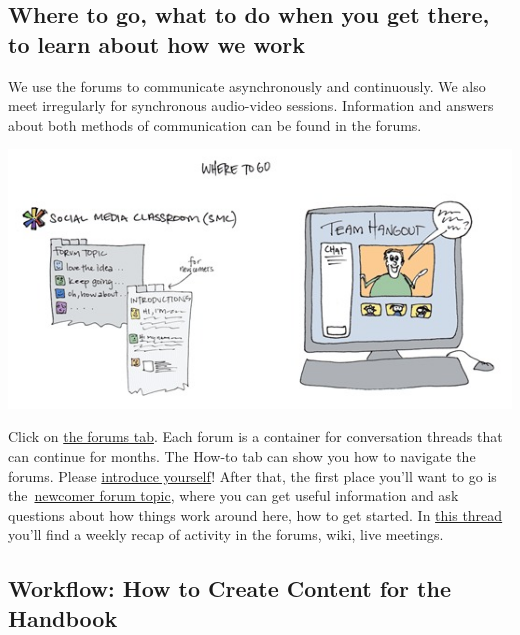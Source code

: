 \subsection{Where to go, what to do when you get there, to learn about
how we work}

We use the forums to communicate asynchronously and continuously. We
also meet irregularly for synchronous audio-video sessions. Information
and answers about both methods of communication can be found in the
forums.

\begin{center}
\href{http://peeragogy.org/wp-content/uploads/2012/03/where\_to\_go\_color.gif}{\includegraphics[width=.9\textwidth]{../pictures/where_to_go_color.jpg}}
\end{center}

Click on \href{http://socialmediaclassroom.com/host/peeragogy/forum}{the
forums tab}. Each forum is a container for conversation threads that can
continue for months. The How-to tab can show you how to navigate the
forums. Please
\href{http://socialmediaclassroom.com/host/peeragogy/forum/please-introduce-yourself}{introduce
yourself}! After that, the first place you'll want to go is
the~\href{http://socialmediaclassroom.com/host/peeragogy/forum/newcomers-start-here-welcome-center}{newcomer
forum topic}, where you can get useful information and ask questions
about how things work around here, how to get started. In
\href{http://socialmediaclassroom.com/host/peeragogy/forum/recaps-and-updates-forum-wiki-tools-handbook-activity}{this
thread} you'll find a weekly recap of activity in the forums, wiki, live
meetings.

\subsection{Workflow: How to Create Content for the Handbook}

